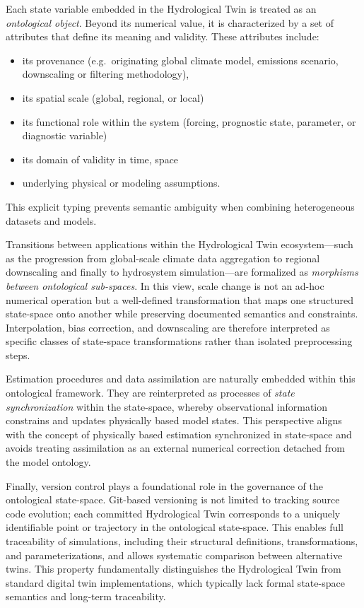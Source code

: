 Each state variable embedded in the Hydrological Twin is treated as an \emph{ontological object}. Beyond its numerical value, it is characterized by a set of attributes that define its meaning and validity. These attributes include: \begin{itemize}
    \item its provenance (e.g.\ originating global climate model, emissions scenario, downscaling or filtering methodology),
    \item its spatial scale (global, regional, or local)
    \item its functional role within the system (forcing, prognostic state, parameter, or diagnostic variable)
    \item its domain of validity in time, space
    \item underlying physical or modeling assumptions. 
 \end{itemize} 
 This explicit typing prevents semantic ambiguity when combining heterogeneous datasets and models.

Transitions between applications within the Hydrological Twin ecosystem—such as the progression from global-scale climate data aggregation to regional downscaling and finally to hydrosystem simulation—are formalized as \emph{morphisms between ontological sub-spaces}. In this view, scale change is not an ad-hoc numerical operation but a well-defined transformation that maps one structured state-space onto another while preserving documented semantics and constraints. Interpolation, bias correction, and downscaling are therefore interpreted as specific classes of state-space transformations rather than isolated preprocessing steps.

Estimation procedures and data assimilation are naturally embedded within this ontological framework. They are reinterpreted as processes of \emph{state synchronization} within the state-space, whereby observational information constrains and updates physically based model states. This perspective aligns with the concept of physically based estimation synchronized in state-space and avoids treating assimilation as an external numerical correction detached from the model ontology.

Finally, version control plays a foundational role in the governance of the ontological state-space. Git-based versioning is not limited to tracking source code evolution; each committed Hydrological Twin corresponds to a uniquely identifiable point or trajectory in the ontological state-space. This enables full traceability of simulations, including their structural definitions, transformations, and parameterizations, and allows systematic comparison between alternative twins. This property fundamentally distinguishes the Hydrological Twin from standard digital twin implementations, which typically lack formal state-space semantics and long-term traceability.

